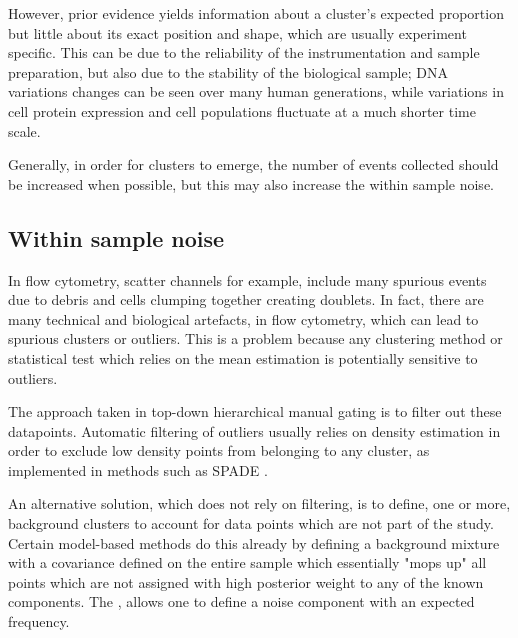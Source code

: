 However, prior evidence yields information about a cluster's expected proportion but little about its exact position and shape, which are usually experiment specific.
This can be due to the reliability of the instrumentation and sample preparation, but also due to the stability of the biological sample; DNA variations changes can be seen over many human generations, while variations in cell protein expression and cell populations fluctuate at a much shorter time scale.

Generally, in order for clusters to emerge, the number of events collected should be increased when possible, but this may also increase the within sample noise.


\subsection{ Within sample noise }

In flow cytometry, scatter channels for example, include many spurious events due to debris and cells clumping together creating doublets.
In fact, there are many technical and biological artefacts, in flow cytometry, which can lead to spurious clusters or outliers.
This is a problem because any clustering method or statistical test which relies on the mean estimation is potentially sensitive to outliers.

The approach taken in top-down hierarchical manual gating is to filter out these datapoints.
Automatic filtering of outliers usually relies on density estimation in order to exclude low density points from belonging to any cluster, as implemented in methods such as SPADE \citep{Simonds:2011jh}.

An alternative solution, which does not rely on filtering, is to define, one or more, background clusters to account for data points which are not part of the study.
Certain model-based methods do this already by defining a background mixture with a covariance defined on the entire sample which essentially "mops up" all points which are not assigned with high posterior weight to any of the known components.
The , allows one to define a noise component with an expected frequency.


